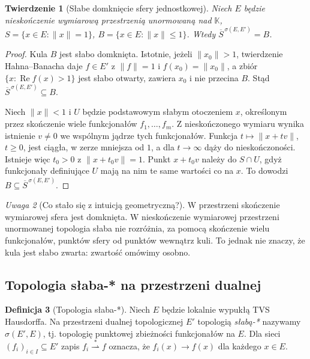 \documentclass[11pt,a4paper]{article}
\numberwithin{equation}{section}
\theoremstyle{plain}
\newtheorem{twierdzenie}{Twierdzenie}[section]
\theoremstyle{definition}
\newtheorem{definicja}[twierdzenie]{Definicja}
\theoremstyle{remark}
\newtheorem{uwaga}[twierdzenie]{Uwaga}
\newcommand{\K}{\mathbb K}
\begin{document}
\begin{twierdzenie}[Słabe domknięcie sfery jednostkowej]
\label{thm:sfera-slaba}
Niech $E$ będzie nieskończenie wymiarową przestrzenią
unormowaną nad $\K$, $S=\{x\in E:\|x\|=1\}$,
$B=\{x\in E:\|x\|\le1\}$. Wtedy
$\overline S^{\,\sigma(E,E')}=B$.
\end{twierdzenie}
\begin{proof}
Kula $B$ jest słabo domknięta. Istotnie, jeżeli
$\|x_0\|>1$, twierdzenie Hahna--Banacha daje
$f\in E'$ z $\|f\|=1$ i $f(x_0)=\|x_0\|$,
a zbiór $\{x:\operatorname{Re}f(x)>1\}$ jest słabo
otwarty, zawiera $x_0$ i nie przecina $B$.
Stąd $\overline S^{\,\sigma(E,E')}\subseteq B$.

Niech $\|x\|<1$ i $U$ będzie podstawowym słabym
otoczeniem $x$, określonym przez skończenie wiele
funkcjonałów $f_1,\ldots,f_m$. Z nieskończonego wymiaru
wynika istnienie $v\ne0$ we wspólnym jądrze tych
funkcjonałów. Funkcja $t\mapsto\|x+tv\|$, $t\ge0$,
jest ciągła, w zerze mniejsza od $1$, a dla $t\to\infty$
dąży do nieskończoności. Istnieje więc $t_0>0$
z $\|x+t_0v\|=1$. Punkt $x+t_0v$ należy do
$S\cap U$, gdyż funkcjonały definiujące $U$ mają
na nim te same wartości co na $x$. To dowodzi
$B\subseteq\overline S^{\,\sigma(E,E')}$.
\end{proof}

\begin{uwaga}[Co stało się z intuicją geometryczną?]
W przestrzeni skończenie wymiarowej sfera jest domknięta.
W nieskończenie wymiarowej przestrzeni unormowanej topologia
słaba nie rozróżnia, za pomocą skończenie wielu funkcjonałów,
punktów sfery od punktów wewnątrz kuli. To jednak nie znaczy,
że kula jest słabo zwarta: zwartość omówimy osobno.
\end{uwaga}

\subsection{Topologia słaba-* na przestrzeni dualnej}

\begin{definicja}[Topologia słaba-*]\label{def:slaba-gwiazdka}
Niech $E$ będzie lokalnie wypukłą TVS Hausdorffa.
Na przestrzeni dualnej topologicznej $E'$ topologią
\emph{słabą-*} nazywamy $\sigma(E',E)$, tj. topologię
punktowej zbieżności funkcjonałów na $E$. Dla sieci
$(f_i)_{i\in I}\subseteq E'$ zapis
$f_i\overset{*}{\rightharpoonup}f$ oznacza, że
$f_i(x)\to f(x)$ dla każdego $x\in E$.
\end{definicja}
\end{document}
